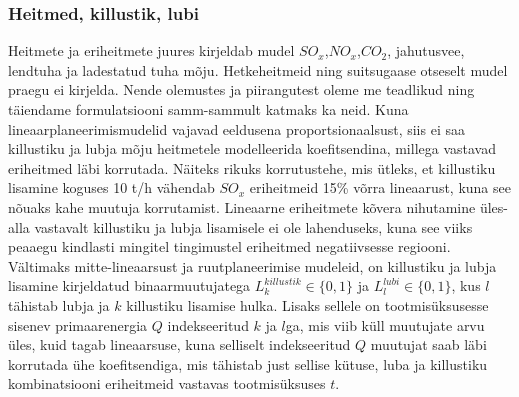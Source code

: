 \documentclass[10pt,a4paper]{article}
\begin{document}
\subsubsection{Heitmed, killustik, lubi}
Heitmete ja eriheitmete juures kirjeldab mudel $SO_x$,$NO_x$,$CO_2$, jahutusvee, lendtuha ja ladestatud tuha mõju. Hetkeheitmeid ning suitsugaase otseselt mudel praegu ei kirjelda. Nende olemustes ja piirangutest oleme me teadlikud ning täiendame formulatsiooni samm-sammult katmaks ka neid. Kuna lineaarplaneerimismudelid vajavad eeldusena proportsionaalsust, siis ei saa killustiku ja lubja mõju heitmetele modelleerida koefitsendina, millega vastavad eriheitmed läbi korrutada. Näiteks rikuks korrutustehe, mis ütleks, et killustiku lisamine koguses 10 t/h vähendab $SO_x$ eriheitmeid 15\% võrra lineaarust, kuna see nõuaks kahe muutuja korrutamist. Lineaarne eriheitmete kõvera nihutamine üles-alla vastavalt killustiku ja lubja lisamisele ei ole lahenduseks, kuna see viiks peaaegu kindlasti mingitel tingimustel eriheitmed negatiivsesse regiooni. Vältimaks mitte-lineaarsust ja ruutplaneerimise mudeleid, on killustiku ja lubja lisamine kirjeldatud binaarmuutujatega $L^{killustik}_k \in \{0,1\}$ ja $L^{lubi}_l \in \{0,1\}$, kus $l$ tähistab lubja ja $k$ killustiku lisamise hulka. Lisaks sellele on tootmisüksusesse sisenev primaarenergia $Q$ indekseeritud $k$ ja $l$ga, mis viib küll muutujate arvu üles, kuid tagab lineaarsuse, kuna selliselt indekseeritud $Q$ muutujat saab läbi korrutada ühe koefitsendiga, mis tähistab just sellise kütuse, luba ja killustiku kombinatsiooni eriheitmeid vastavas tootmisüksuses $t$.
\end{document}

